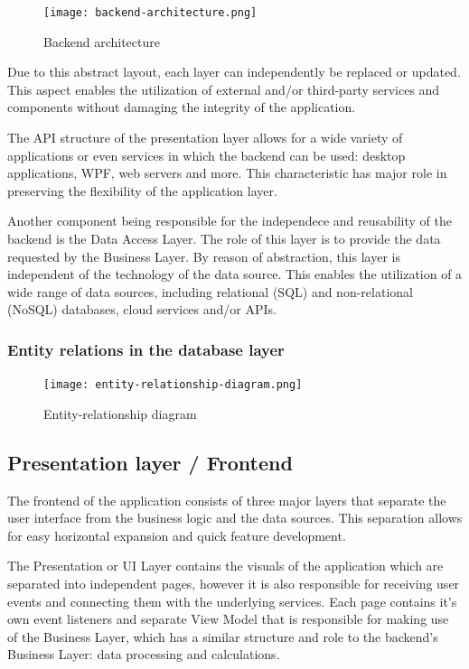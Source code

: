 \begin{figure}[H]
	\centering
	\texttt{[image: backend-architecture.png]}
	\caption{Backend architecture}
\end{figure}

Due to this abstract layout, each layer can independently be replaced or updated. 
This aspect enables the utilization of external and/or third-party services and components without damaging the integrity of the application.

The API structure of the presentation layer allows for a wide variety of applications or even services in which the backend can be used: desktop applications,
WPF, web servers and more. This characteristic has major role in preserving the flexibility of the application layer.

Another component being responsible for the independece and reusability of the backend is the Data Access Layer. 
The role of this layer is to provide the data requested by the Business Layer. 
By reason of abstraction, this layer is independent of the technology of the data source. 
This enables the utilization of a wide range of data sources, including relational (SQL) and non-relational (NoSQL) databases, cloud services and/or APIs.

\subsubsection{Entity relations in the database layer}

\begin{figure}[H]
	\centering
	\texttt{[image: entity-relationship-diagram.png]}
	\caption{Entity-relationship diagram}
\end{figure}

\subsection{Presentation layer / Frontend}

The frontend of the application consists of three major layers that separate the user interface from the business logic and the data sources.
This separation allows for easy horizontal expansion and quick feature development.

The Presentation or UI Layer contains the visuals of the application which are separated into independent pages, however it is also responsible for receiving
user events and connecting them with the underlying services.
Each page contains it's own event listeners and separate View Model that is responsible for making use of the Business Layer,
which has a similar structure and role to the backend's Business Layer: data processing and calculations.

